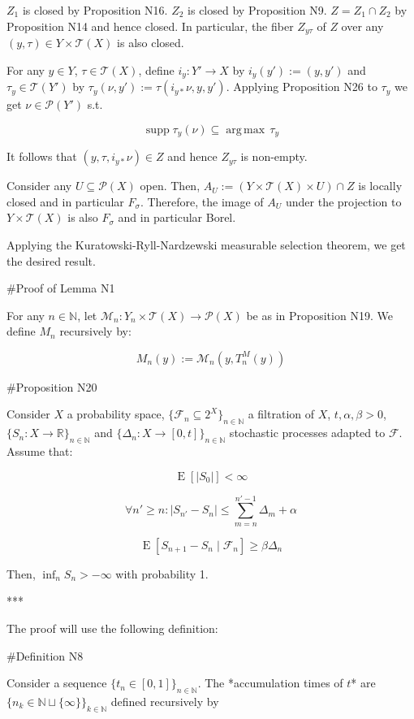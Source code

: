 \documentclass[a4paper]{article}
\DeclareMathOperator{\Supp}{supp}
\DeclareMathOperator{\E}{E}
\newcommand{\Argmax}[1]{\underset{#1}{\operatorname{arg\,max}}\,}
\newcommand{\Nats}{\mathbb{N}}
\newcommand{\Reals}{\mathbb{R}}
\newcommand{\Sq}[2]{\{#1\}_{#2 \in \Nats}}
\newcommand{\Sqn}[1]{\Sq{#1}{n}}
\newcommand{\Abs}[1]{\lvert #1 \rvert}
\newcommand{\Prob}{\mathcal{P}}
\newcommand{\T}{\mathcal{T}}
\newcommand{\F}{\mathcal{F}}
\begin{document}
${Z_1}$ is closed by Proposition N16. ${Z_2}$ is closed by Proposition N9. ${Z = Z_1 \cap Z_2}$ by Proposition N14 and hence closed. In particular, the fiber ${Z_{y\tau}}$ of ${Z}$ over any ${(y,\tau) \in Y \times \T(X)}$ is also closed. 

For any ${y \in Y}$, ${\tau \in \T(X)}$, define ${i_y: Y' \rightarrow X}$ by ${i_y(y'):=(y,y')}$ and ${\tau_y \in \T(Y')}$ by ${\tau_y(\nu,y'):=\tau(i_{y*}\nu,y,y')}$. Applying Proposition N26 to ${\tau_y}$ we get ${\nu \in \Prob(Y')}$ s.t.

$$\Supp \tau_y(\nu) \subseteq \Argmax{} \tau_y$$

It follows that ${(y,\tau,i_{y*}\nu) \in Z}$ and hence ${Z_{y\tau}}$ is non-empty.

Consider any ${U \subseteq \Prob(X)}$ open. Then, ${A_U:=(Y \times \T(X) \times U) \cap Z}$ is locally closed and in particular ${F_\sigma}$. Therefore, the image of ${A_U}$ under the projection to ${Y \times \T(X)}$ is also ${F_\sigma}$ and in particular Borel. 

Applying the Kuratowski-Ryll-Nardzewski measurable selection theorem, we get the desired result.

\#Proof of Lemma N1

For any ${n \in \Nats}$, let ${\mathcal{M}_n: Y_n \times \T(X) \rightarrow \Prob(X)}$ be as in Proposition N19. We define ${M_n}$ recursively by:

$$M_n(y):=\mathcal{M}_n(y,T_n^M(y))$$

\#Proposition N20

Consider ${X}$ a probability space, ${\{\F_n \subseteq 2^X\}_{n \in \Nats}}$ a filtration of ${X}$, ${t,\alpha,\beta > 0}$, ${\{S_n:X \rightarrow \Reals\}_{n \in \Nats}}$ and ${\{\Delta_n:X \rightarrow [0,t]\}_{n \in \Nats}}$ stochastic processes adapted to ${\F}$. Assume that:

$$\E[\Abs{S_0}] < \infty$$

$$\forall n' \geq n:\Abs{S_{n'}-S_{n}} \leq \sum_{m=n}^{n'-1} \Delta_m + \alpha$$

$$\E[S_{n+1} - S_n \mid \F_n] \geq \beta \Delta_n$$

Then, ${\inf_{n} S_n > -\infty}$ with probability 1.

***

The proof will use the following definition:

\#Definition N8

Consider a sequence ${\Sqn{t_n \in [0,1]}}$. The *accumulation times of ${t}$* are ${\Sq{n_k \in \Nats \sqcup \{\infty\}}{k}}$ defined recursively by
\end{document}
